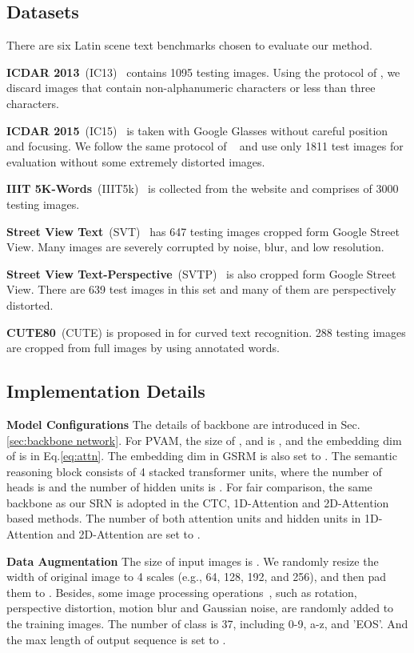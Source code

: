 \documentclass[10pt,twocolumn,letterpaper]{article}
\begin{document}
\begin{CJK}{UTF8}{gbsn}
\subsection{Datasets}
There are six Latin scene text benchmarks chosen to evaluate our method.

\textbf{ICDAR 2013}~(IC13)~\cite{icd2013-karatzas2013icdar} contains
1095 testing images. Using the protocol of \cite{svt-wang2011end}, we discard images that contain non-alphanumeric characters or less than three characters.

\textbf{ICDAR 2015}~(IC15)~\cite{icd2015-karatzas2015icdar} is taken with Google Glasses without careful position and focusing. 
We follow the same protocol of ~\cite{cheng2017focusing} and use only 1811 test images for evaluation without some extremely distorted images.


\textbf{IIIT 5K-Words}~(IIIT5k)~\cite{iiit5k-MishraBMVC12} is collected from the website and comprises of 3000 testing images.

\textbf{Street View Text}~(SVT)~\cite{svt-wang2011end} has
647 testing images cropped form Google Street View. Many images are severely corrupted by noise, blur, and low resolution. 

\textbf{Street View Text-Perspective}~(SVTP)~\cite{svtp-quy2013recognizing} is also cropped form Google Street View. There are 639 test images in this set and many of them are perspectively distorted. 

\textbf{CUTE80}~(CUTE) is proposed in \cite{cute-risnumawan2014robust} for curved text recognition.
288 testing images are cropped from full images by using annotated words.

\subsection{Implementation Details}\label{sec:Implementation_Detail}
\textbf{Model Configurations}
The details of backbone are introduced in Sec.\ref{sec:backbone network}. For PVAM, the size of ,  and  is , and the embedding dim of  is  in Eq.\ref{eq:attn}.
The embedding dim in GSRM is also set to . 
The semantic reasoning block consists of 4 stacked transformer units, where the number of heads is  and the number of hidden units is .
For fair comparison, the same backbone as our SRN is adopted in the CTC, 1D-Attention and 2D-Attention based methods.
The number of both attention units and hidden units in 1D-Attention and 2D-Attention are set to .

\textbf{Data Augmentation} 
The size of input images is . We randomly resize the width of original image to 4 scales (e.g., 64, 128, 192, and 256), and then pad them to .
Besides, some image processing operations~\cite{liao2019mask}, such as rotation, perspective distortion, motion blur and Gaussian noise, are randomly added to the training images.
The number of class is 37, including 0-9, a-z, and 'EOS'. And the max length of output sequence  is set to .


\end{CJK}
\end{document}
